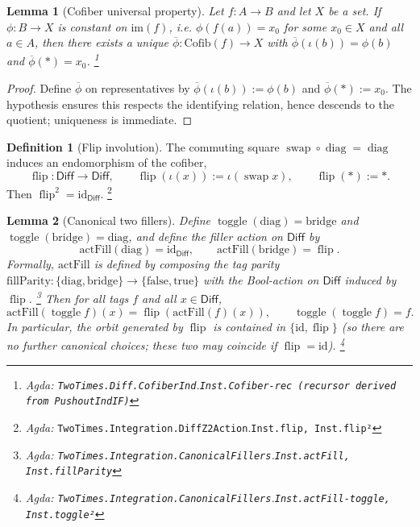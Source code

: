 \documentclass{article}
\newcommand{\Diff}{\mathsf{Diff}}
\newcommand{\diag}{\operatorname{diag}}
\newcommand{\swap}{\operatorname{swap}}
\newcommand{\flip}{\operatorname{flip}}
\newcommand{\Agda}[1]{\texttt{#1}}
\newcommand{\AgdaRef}[2]{\emph{Agda: }\Agda{#1}.\Agda{#2}}
\newcommand{\AgdaNote}[2]{\footnote{\AgdaRef{#1}{#2}}}
\theoremstyle{definition}
\newtheorem{definition}{Definition}[section]
\theoremstyle{plain}
\newtheorem{lemma}{Lemma}[section]
\begin{document}
\begin{lemma}[Cofiber universal property]
\label{lem:cofiber-up}
Let $f:A\to B$ and let $X$ be a set. If $\phi:B\to X$ is constant on $\mathrm{im}(f)$,
i.e. $\phi(f(a))=x_0$ for some $x_0\in X$ and all $a\in A$, then there exists a unique
$\overline\phi:\mathrm{Cofib}(f)\to X$ with $\overline\phi(\iota(b))=\phi(b)$ and
$\overline\phi(\ast)=x_0$.
\AgdaNote{TwoTimes.Diff.CofiberInd}{Inst.Cofiber-rec (recursor derived from PushoutIndIF)}
\end{lemma}

\begin{proof}
Define $\overline\phi$ on representatives by $\overline\phi(\iota(b)):=\phi(b)$ and
$\overline\phi(\ast):=x_0$. The hypothesis ensures this respects the identifying
relation, hence descends to the quotient; uniqueness is immediate.
\end{proof}

\begin{definition}[Flip involution]
The commuting square $\swap\circ\diag=\diag$ induces an endomorphism of the cofiber,
\[\flip:\Diff\to\Diff,\qquad \flip(\iota(x)):=\iota(\swap x),\qquad \flip(\ast):=\ast.\]
Then $\flip^2=\mathrm{id}_{\Diff}$.
\AgdaNote{TwoTimes.Integration.DiffZ2Action}{Inst.flip, Inst.flip²}
\end{definition}

\begin{lemma}[Canonical two fillers]
\label{lem:canonical-fillers}
Define $\operatorname{toggle}(\mathrm{diag})=\mathrm{bridge}$ and $\operatorname{toggle}(\mathrm{bridge})=\mathrm{diag}$, and
define the filler action on $\Diff$ by
\[
\mathrm{actFill}(\mathrm{diag})=\mathrm{id}_{\Diff},\qquad
\mathrm{actFill}(\mathrm{bridge})=\flip.
\]
Formally, $\mathrm{actFill}$ is defined by composing the tag parity
$\mathrm{fillParity}:\{\mathrm{diag},\mathrm{bridge}\}\to\{\mathrm{false},\mathrm{true}\}$
with the Bool-action on $\Diff$ induced by $\flip$.
\AgdaNote{TwoTimes.Integration.CanonicalFillers}{Inst.actFill, Inst.fillParity}
Then for all tags $f$ and all $x\in\Diff$,
\[
\mathrm{actFill}(\operatorname{toggle} f)(x)=\flip(\mathrm{actFill}(f)(x)),\qquad
\operatorname{toggle}(\operatorname{toggle} f)=f.
\]
In particular, the orbit generated by $\flip$ is contained in $\{\mathrm{id},\flip\}$
(so there are no further canonical choices; these two may coincide if $\flip=\mathrm{id}$).
\AgdaNote{TwoTimes.Integration.CanonicalFillers}{Inst.actFill-toggle, Inst.toggle²}
\end{lemma}
\end{document}
